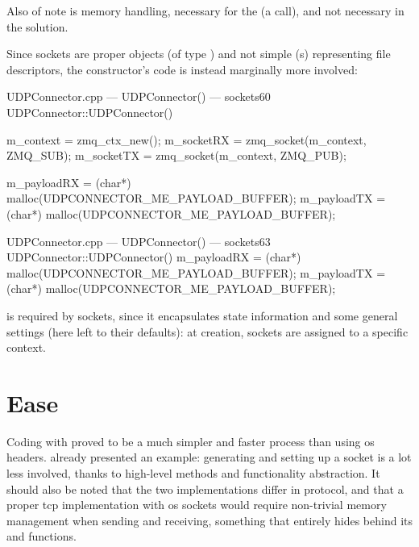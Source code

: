 \FLOATnoindent Also of note is memory handling, necessary for the   (a  call), and not necessary in the  solution.

Since  sockets are proper  objects (of type ) and not simple (s) representing file descriptors, the constructor's code is instead marginally more involved:

\begin{codelist}{UDPConnector.cpp --- UDPConnector() ---  sockets}{60}
UDPConnector::UDPConnector() {
	m_context  = zmq_ctx_new();
	m_socketRX = zmq_socket(m_context, ZMQ_SUB);
	m_socketTX = zmq_socket(m_context, ZMQ_PUB);

	m_payloadRX = (char*) malloc(UDPCONNECTOR_ME_PAYLOAD_BUFFER);
	m_payloadTX = (char*) malloc(UDPCONNECTOR_ME_PAYLOAD_BUFFER);
}
\end{codelist}

\begin{codelist}{UDPConnector.cpp --- UDPConnector() ---  sockets}{63}
UDPConnector::UDPConnector() {
	m_payloadRX = (char*) malloc(UDPCONNECTOR_ME_PAYLOAD_BUFFER);
	m_payloadTX = (char*) malloc(UDPCONNECTOR_ME_PAYLOAD_BUFFER);
}
\end{codelist}

\FLOATnoindent {} is required by  sockets, since it encapsulates state information and some general settings (here left to their defaults): at creation, sockets are assigned to a specific context.

\section{Ease}\label{sc:code:ease}

Coding with  proved to be a much simpler and faster process than using \gls{os} headers.  already presented an example: generating and setting up a socket is a lot less involved, thanks to high-level methods and functionality abstraction. It should also be noted that the two implementations differ in protocol, and that a proper \gls{tcp} implementation with \gls{os} sockets would require non-trivial memory management when sending and receiving, something that  entirely hides behind its  and  functions.

